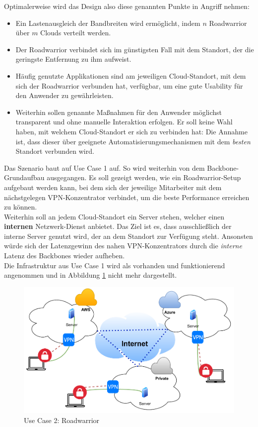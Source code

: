 Optimalerweise wird das Design also diese genannten Punkte in Angriff nehmen:
\begin{itemize}
\item Ein Lastenausgleich der Bandbreiten wird ermöglicht, indem $n$ \gls{Roadwarrior} über $m$ Clouds verteilt werden.
\item Der \gls{Roadwarrior} verbindet sich im günstigsten Fall mit dem Standort, der die geringste Entfernung zu ihm aufweist.
\item Häufig genutzte Applikationen sind am jeweiligen Cloud-Standort, mit dem sich der \gls{Roadwarrior} verbunden hat, verfügbar, um eine gute Usability für den Anwender zu gewährleisten.
\item Weiterhin sollen genannte Maßnahmen für den Anwender möglichst transparent und ohne manuelle Interaktion erfolgen. Er soll keine Wahl haben, mit welchem Cloud-Standort er sich zu verbinden hat: Die Annahme ist, dass dieser über geeignete Automatisierungsmechanismen mit dem \textit{besten} Standort verbunden wird.
\end{itemize}
Das Szenario baut auf Use Case 1 auf. So wird weiterhin von dem Backbone-Grundaufbau ausgegangen. Es soll gezeigt werden, wie ein \gls{Roadwarrior}-Setup aufgebaut werden kann, bei dem sich der jeweilige Mitarbeiter mit dem nächstgelegen \gls{VPN-Konzentrator} verbindet, um die beste Performance erreichen zu können.\\
Weiterhin soll an jedem Cloud-Standort ein Server stehen, welcher einen \textbf{internen} Netz\-werk-Dienst anbietet. Das Ziel ist es, dass ausschließlich der interne Server genutzt wird, der an dem Standort zur Verfügung steht. Ansonsten würde sich der Latenzgewinn des nahen \gls{VPN-Konzentrator}s durch die \textit{interne} Latenz des Backbones wieder aufheben.\\
Die Infrastruktur aus Use Case 1 wird als vorhanden und funktionierend angenommen und in Abbildung \ref{grafik:Use-Case-2_Vereinfacht} nicht mehr dargestellt.
\begin{figure}[h]
  \centering
  \includegraphics[scale=0.75]{Figures/Use-Case_2_Vereinfacht_1.pdf}
  \caption{Use Case 2: Roadwarrior}
  \label{grafik:Use-Case-2_Vereinfacht}
\end{figure}\FloatBarrier

